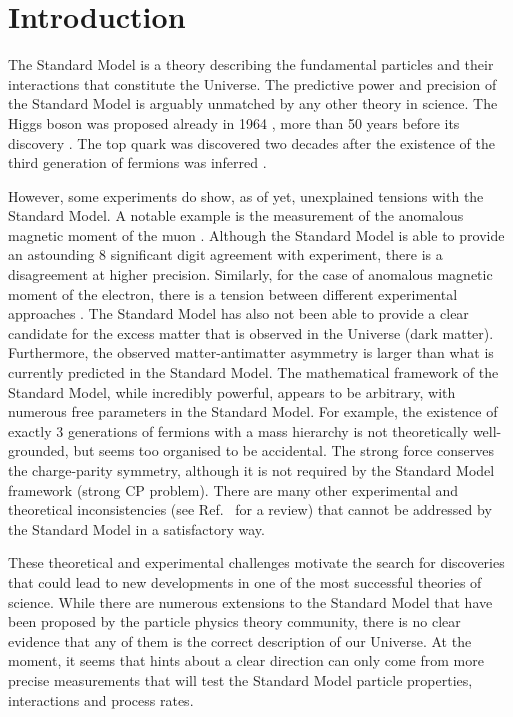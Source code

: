 \chapter{Introduction}\label{sec:introduction}

The Standard Model is a theory describing the fundamental particles and their interactions that constitute the Universe.
The predictive power and precision of the Standard Model is arguably unmatched by any other theory in science.
The Higgs boson was proposed already in 1964 \cite{PhysRevLett.13.508}, more than 50 years before its discovery \cite{ATLAS:2012yve,CMS:2012qbp}.
The top quark was discovered \cite{PhysRevLett.74.2632,PhysRevLett.74.2626} two decades after the existence of the third generation of fermions was inferred \cite{HARARI1975265}.

However, some experiments do show, as of yet, unexplained tensions with the Standard Model. 
A notable example is the measurement of the anomalous magnetic moment of the muon \cite{PhysRevLett.126.141801}.
Although the Standard Model is able to provide an astounding 8 significant digit agreement with experiment, there is a disagreement at higher precision.
Similarly, for the case of anomalous magnetic moment of the electron, there is a tension between different experimental approaches \cite{PhysRevLett.100.120801,Morel:2020dww,Li:2021koa}.
The Standard Model has also not been able to provide a clear candidate for the excess matter that is observed in the Universe (dark matter).
Furthermore, the observed matter-antimatter asymmetry 
is larger than what is currently predicted in the Standard Model.
The mathematical framework of the Standard Model, while incredibly powerful, appears to be arbitrary, with numerous free parameters in the Standard Model.
For example, the existence of exactly 3 generations of fermions with a mass hierarchy is not theoretically well-grounded, but seems too organised to be accidental.
The strong force conserves the charge-parity symmetry, although it is not required by the Standard Model framework (strong CP problem).
There are many other experimental and theoretical inconsistencies (see Ref.~\cite{Ellis:2002wba} for a review) that cannot be addressed by the Standard Model in a satisfactory way.

These theoretical and experimental challenges motivate the search for discoveries that could lead to new developments in one of the most successful theories of science.
While there are numerous extensions to the Standard Model that have been proposed by the particle physics theory community, there is no clear evidence that any of them is the correct description of our Universe.
At the moment, it seems that hints about a clear direction can only come from more precise measurements that will test the Standard Model particle properties, interactions and process rates.

